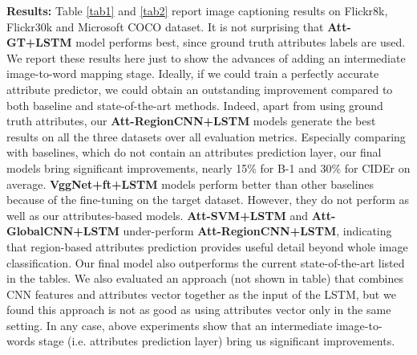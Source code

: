 \vspace{3pt}
\noindent\textbf{Results:} Table \ref{tab1} and \ref{tab2} report image captioning results on Flickr8k, Flickr30k and Microsoft COCO dataset. It is not surprising that \textbf{Att-GT+LSTM} model performs best, since ground truth attributes labels are used. We report these results here just to show the advances of adding an intermediate image-to-word mapping stage. Ideally, if we could train a perfectly accurate attribute predictor, we could obtain an outstanding improvement compared to both baseline and state-of-the-art methods. Indeed, apart from using ground truth attributes, our \textbf{Att-RegionCNN+LSTM} models generate the best results on all the three datasets over all evaluation metrics. Especially comparing with baselines, which do not contain an attributes prediction layer, our final models bring significant improvements, nearly 15\% for B-1 and 30\% for CIDEr on average. \textbf{VggNet+ft+LSTM} models perform better than other baselines because of the fine-tuning on the target dataset. However, they do not perform as well as our attributes-based models. \textbf{Att-SVM+LSTM} and \textbf{Att-GlobalCNN+LSTM} under-perform \textbf{Att-RegionCNN+LSTM}, indicating that region-based attributes prediction provides useful detail beyond whole image classification. Our final model also outperforms the current state-of-the-art listed in the tables. We also evaluated an approach (not shown in table) that combines CNN features and attributes vector together as the input of the LSTM, but we found this approach is not as good as using attributes vector only in the same setting.  In any case, above experiments show that an intermediate image-to-words stage (i.e. attributes prediction layer) bring us significant improvements.

